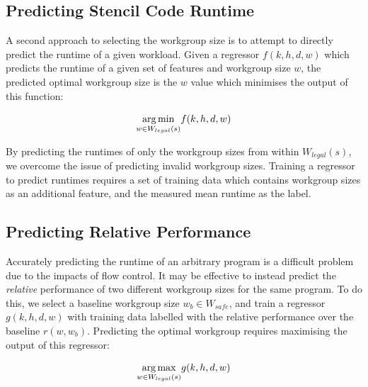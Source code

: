 \subsection{Predicting Stencil Code Runtime}

A second approach to selecting the workgroup size is to attempt to
directly predict the runtime of a given workload. Given a regressor
$f(k,h,d,w)$ which predicts the runtime of a given set of features and
workgroup size $w$, the predicted optimal workgroup size is the $w$
value which minimises the output of this function:

\begin{equation}
  \underset{w \in W_{legal}(s)}{\operatorname*{arg\,min}} f(k,h,d,w)
\end{equation}

By predicting the runtimes of only the workgroup sizes from within
$W_{legal}(s)$, we overcome the issue of predicting invalid workgroup
sizes. Training a regressor to predict runtimes requires a set of
training data which contains workgroup sizes as an additional feature,
and the measured mean runtime as the label.

% 

\subsection{Predicting Relative Performance}

Accurately predicting the runtime of an arbitrary program is a
difficult problem due to the impacts of flow control. It may be
effective to instead predict the \emph{relative} performance of two
different workgroup sizes for the same program. To do this, we select
a baseline workgroup size $w_b \in W_{safe}$, and train a regressor
$g(k,h,d,w)$ with training data labelled with the relative performance
over the baseline $r(w, w_b)$. Predicting the optimal workgroup
requires maximising the output of this regressor:

\begin{equation}
  \underset{w \in W_{legal}(s)}{\operatorname*{arg\,max}} g(k,h,d,w)
\end{equation}

% 


